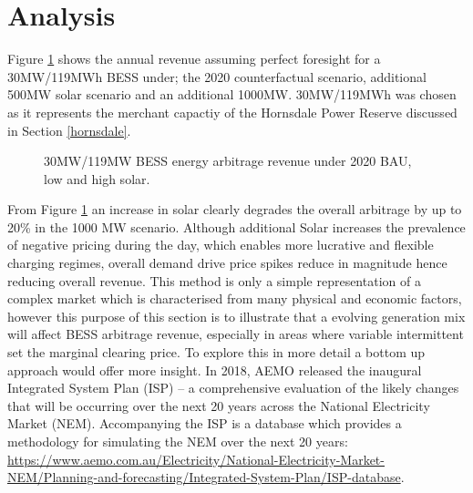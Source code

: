 \section{ Analysis }
Figure \ref{fig:bess_w_solar} shows the annual revenue assuming perfect foresight for a 30MW/119MWh BESS under; the 2020 counterfactual scenario, additional 500MW solar scenario and  an additional 1000MW. 30MW/119MWh was chosen as it represents the merchant capactiy of the Hornsdale Power Reserve discussed in Section \ref{hornsdale}.
\begin{figure}[H]
    \centering
    \caption{30MW/119MW BESS energy arbitrage revenue under 2020 BAU, low and high solar.}
    \label{fig:bess_w_solar}
\end{figure}
From Figure \ref{fig:bess_w_solar} an increase in solar clearly degrades the overall arbitrage by up to 20\% in the 1000 MW scenario. Although additional Solar increases the prevalence of negative pricing during the day, which enables more lucrative and flexible charging regimes, overall demand drive price spikes reduce in magnitude hence reducing overall revenue.
\newline
\newline
This method is only a simple representation of a complex market which is characterised from many physical and economic factors, however this purpose of this section is to illustrate that a evolving generation mix will affect BESS arbitrage revenue, especially in areas where variable intermittent set the marginal clearing price. To explore this in more detail a bottom up approach would offer more insight. In 2018, AEMO released the inaugural Integrated System Plan (ISP) – a comprehensive evaluation of the likely changes that will be occurring over the next 20 years across the National Electricity Market (NEM). Accompanying the ISP is a database which provides a methodology for simulating the NEM over the next 20 years: \url{https://www.aemo.com.au/Electricity/National-Electricity-Market-NEM/Planning-and-forecasting/Integrated-System-Plan/ISP-database}. 